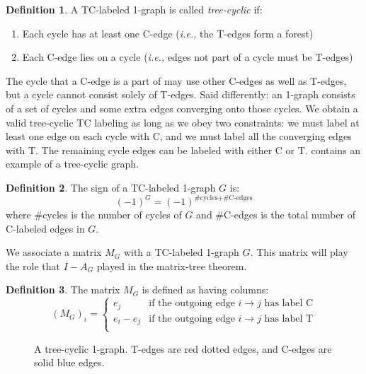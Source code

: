 \documentclass[a4paper, 11pt]{article}
\theoremstyle{definition}
\newtheorem{definition}{Definition}[section]
\begin{document}
\begin{definition}
  A TC-labeled 1-graph is called \emph{tree-cyclic} if:
  \begin{enumerate}
    \item Each cycle has at least one C-edge (\emph{i.e.,} the T-edges form a forest)
    \item Each C-edge lies on a cycle (\emph{i.e.,} edges not part of a cycle must be T-edges)
  \end{enumerate}
\end{definition}

The cycle that a C-edge is a part of may use other C-edges as well as T-edges, but a cycle cannot consist solely of T-edges.
Said differently: an 1-graph consists of a set of cycles and some extra edges converging onto those cycles. We obtain a valid tree-cyclic TC labeling as long as we obey two constraints: we must label at least one edge on each cycle with C, and we must label all the converging edges with T. The remaining cycle edges can be labeled with either C or T.
 contains an example of a tree-cyclic graph.

\begin{definition}
  The sign of a TC-labeled 1-graph $G$ is:
  \[
   (-1)^{G} = (-1)^{\text{\#cycles} + \text{\#C-edges}}
  \]
  where \#cycles is the number of cycles of $G$ and \#C-edges is the total number of C-labeled edges in $G$.
\end{definition}

We associate a matrix $M_G$ with a TC-labeled 1-graph $G$. This matrix will play the role that $I - A_G$ played in the matrix-tree theorem.

\begin{definition}
  The matrix $M_G$ is defined as having columns:
  \[
    (M_G)_i = \begin{cases}
      e_j & \text{if the outgoing edge $i \to j$ has label C} \\
      e_i - e_j & \text{if the outgoing edge $i \to j$ has label T} \\
    \end{cases}
  \]
\end{definition}

\begin{figure}
  \centering
  \begin{tikzpicture}[spring layout,node distance=30pt, random seed=1]
    
  \end{tikzpicture}
  \caption{A tree-cyclic 1-graph. T-edges are red dotted edges, and C-edges are solid blue edges.}
  \label{fig:tcgraph}
\end{figure}
\end{document}
